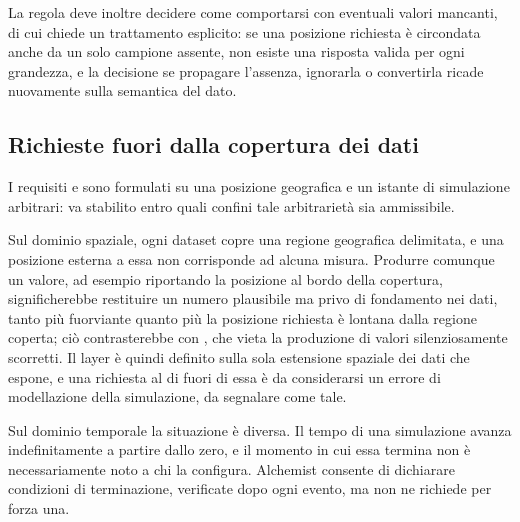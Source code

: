 La regola deve inoltre decidere come comportarsi con eventuali valori mancanti,
di cui  chiede un trattamento esplicito: se una posizione richiesta è
circondata anche da un solo campione assente, non esiste una risposta valida per ogni
grandezza, e la decisione se propagare l'assenza, ignorarla o convertirla ricade nuovamente
sulla semantica del dato.

\FloatBarrier

\subsection{Richieste fuori dalla copertura dei dati}
\label{subsec:estensione-spaziale}

I requisiti  e  sono formulati su una posizione geografica e un istante di
simulazione arbitrari: va stabilito entro quali confini tale arbitrarietà sia ammissibile.

Sul dominio spaziale, ogni dataset copre una regione geografica delimitata, e una posizione
esterna a essa non corrisponde ad alcuna misura. Produrre comunque un valore, ad esempio
riportando la posizione al bordo della copertura, significherebbe restituire un numero
plausibile ma privo di fondamento nei dati, tanto più fuorviante quanto più la posizione
richiesta è lontana dalla regione coperta; ciò contrasterebbe con , che vieta la
produzione di valori silenziosamente scorretti. Il layer è quindi definito sulla sola
estensione spaziale dei dati che espone, e una richiesta al di fuori di essa è da
considerarsi un errore di modellazione della simulazione, da segnalare come tale.

Sul dominio temporale la situazione è diversa. Il tempo di una simulazione avanza
indefinitamente a partire dallo zero, e il momento in cui essa termina non è
necessariamente noto a chi la configura. Alchemist consente di dichiarare condizioni
di terminazione, verificate dopo ogni evento, ma non ne richiede per forza una.

